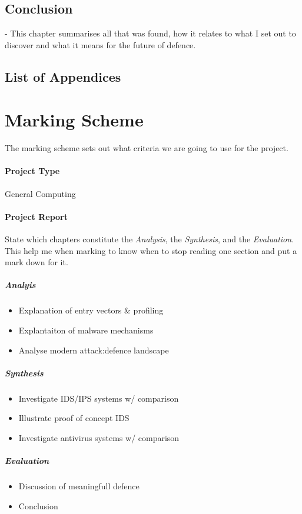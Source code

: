 \subsection{Conclusion} - This chapter summarises all that was found, how it relates to what I set out to discover and what it means for the future of defence. 

\subsection{List of Appendices}


\section{Marking Scheme}
The marking scheme sets out what criteria we are going to use for the project.

\paragraph{Project Type} General Computing

\paragraph{Project Report}  State which chapters constitute the \emph{Analysis}, the \emph{Synthesis}, and the \emph{Evaluation}.  This help me when marking to know when to stop reading one section and put a mark down for it.

\subparagraph{Analyis}
\begin{itemize}
	\item Explanation of entry vectors & profiling
	\item Explantaiton of malware mechanisms
	\item Analyse modern attack:defence landscape
\end{itemize}

\subparagraph{Synthesis}
\begin{itemize}
	\item Investigate IDS/IPS systems w/ comparison
	\item Illustrate proof of concept IDS
	\item Investigate antivirus systems w/ comparison
\end{itemize}

\subparagraph{Evaluation}
\begin{itemize}
	\item Discussion of meaningfull defence
	\item Conclusion
\end{itemize}

